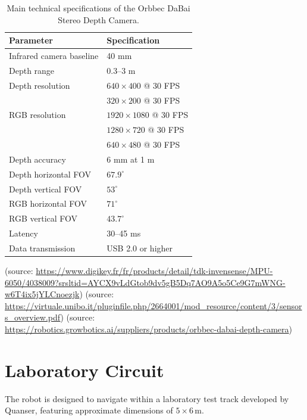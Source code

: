 \documentclass[a4paper,11pt,oneside]{book}
\begin{document}
\begin{table}[H]
    \centering
    \caption{Main technical specifications of the Orbbec DaBai Stereo Depth Camera.}
    \label{tab:camera_specs}

    \begin{tabular}{ll}
        \toprule
        \textbf{Parameter} & \textbf{Specification} \\
        \midrule
        Infrared camera baseline & 40 mm \\
        Depth range & 0.3--3 m \\
        Depth resolution & $640 \times 400$ @ 30 FPS \\
                         & $320 \times 200$ @ 30 FPS \\
        RGB resolution & $1920 \times 1080$ @ 30 FPS \\
                       & $1280 \times 720$ @ 30 FPS \\
                       & $640 \times 480$ @ 30 FPS \\
        Depth accuracy & 6 mm at 1 m \\
        Depth horizontal FOV & $67.9^\circ$ \\
        Depth vertical FOV & $53^\circ$ \\
        RGB horizontal FOV & $71^\circ$ \\
        RGB vertical FOV & $43.7^\circ$ \\
        Latency & 30--45 ms \\
        Data transmission & USB 2.0 or higher \\
        \bottomrule
    \end{tabular}
\end{table}

(source: \url{https://www.digikey.fr/fr/products/detail/tdk-invensense/MPU-6050/4038009?srsltid=AYCX9vLdGtob9dv5gB5Dq7AO9A5o5Ce9G7mWNG-w6T4ix5jYLCnoezjk})
(source: \url{https://virtuale.unibo.it/pluginfile.php/2664001/mod_resource/content/3/sensors_overview.pdf})
(source: \url{https://robotics.growbotics.ai/suppliers/products/orbbec-dabai-depth-camera})

\section{Laboratory Circuit}

The robot is designed to navigate within a laboratory test track
developed by Quanser, featuring approximate dimensions of
$5 \times 6\,\mathrm{m}$.
\end{document}

